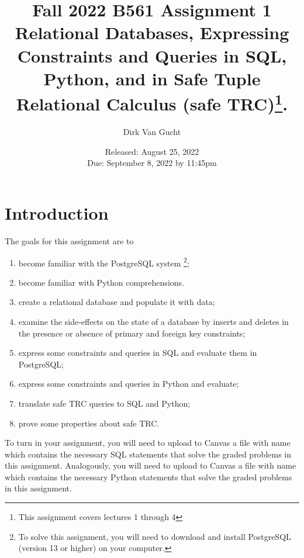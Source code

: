 \documentclass{article}
\newcommand{\blue}[1]{{\color{blue}#1}}
\begin{document}
\title{Fall 2022 B561 Assignment 1 \\
Relational Databases, Expressing Constraints and Queries in SQL, Python, and in Safe Tuple Relational Calculus (safe TRC)\footnote{This assignment covers lectures 1 through 4}.}
\author{Dirk Van Gucht}
\date{Released: August 25, 2022\\ Due: September 8, 2022 by 11:45pm}
\maketitle


\section{Introduction}

The goals for this assignment are to 
\begin{enumerate}
\item become familiar with the PostgreSQL system 
\footnote{To solve this assignment, you will need to download and install PostgreSQL (version 13 or higher) on your computer.};
\item become familiar with Python comprehensions.
\item create a relational database and populate it with data;
\item examine the side-effects on the state of a database by inserts and deletes in the presence or absence
of primary and foreign key constraints;
\item express some constraints and queries in SQL and evaluate them in PostgreSQL;
\item express some constraints and queries in Python and evaluate;
\item translate safe TRC queries to SQL and Python;
\item prove some properties about safe TRC.

\end{enumerate}

To turn in your assignment, you will need to upload to Canvas a file with name \blue{{\tt assignment1.sql}} 
which contains 
the necessary SQL statements that solve the graded problems in this assignment. 
Analogously, you will need to upload to Canvas a file with name \blue{{\tt assignment1.py}} 
which contains 
the necessary Python statements that solve the graded problems in this assignment. 
\end{document}
